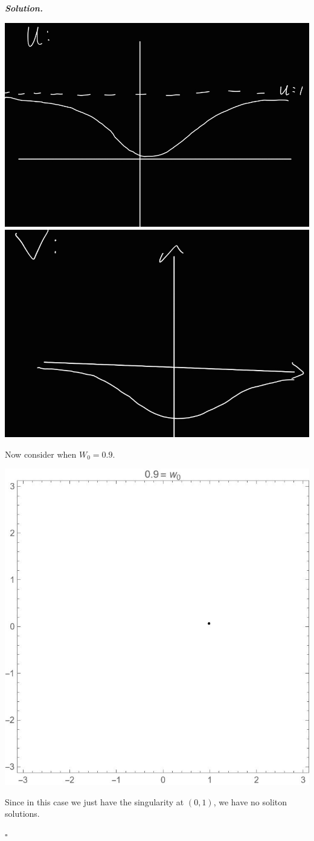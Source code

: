 \documentclass[12pt]{report}
\newenvironment{solution}[1][\it{Solution}]{\textbf{#1. } }{$\square$}
\begin{document}
\begin{solution}
\begin{enumerate}
        \begin{center}
            \includegraphics[width=.4\linewidth]{plots/fig3.jpg}
            \includegraphics[width=.4\linewidth]{plots/fig8.jpg}
        \end{center}

        \noindent
        Now consider when $W_0 = 0.9$.
        \begin{center}
            \includegraphics[width=.5\linewidth]{plots/1-6.jpg}
        \end{center}
        Since in this case we just have the singularity at $(0,1)$, we have no soliton solutions. 

    \end{enumerate}
    


\end{solution}

\newpage

\end{document}
